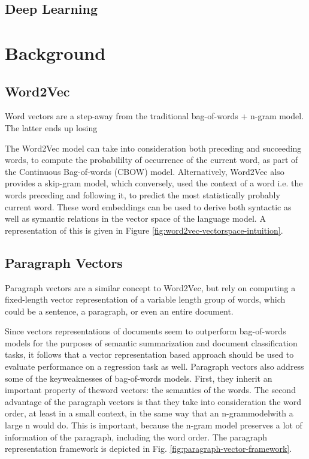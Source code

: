 \documentclass[conference]{IEEEtran}
\begin{document}
\subsection{Deep Learning}


\section{Background}

\subsection{Word2Vec} \label{Word2Vec}
Word vectors are a step-away from the traditional bag-of-words + n-gram model. The latter ends up losing

The Word2Vec model\cite{mikolov2013efficient} can take into consideration both preceding and succeeding words, to compute the probabililty of occurrence of the current word, as part of the Continuous Bag-of-words (CBOW) model. Alternatively, Word2Vec also provides a skip-gram model\cite{mikolov2013distributed}, which conversely, used the context of a word i.e. the words preceding and following it, to predict the most statistically probably current word. These word embeddings can be used to derive both syntactic as well as symantic relations in the vector space of the language model. A representation of this is given in Figure \ref{fig:word2vec-vectorspace-intuition}.

\subsection{Paragraph Vectors}
Paragraph vectors are a similar concept to Word2Vec, but rely on computing a fixed-length vector representation of a variable length group of words, which could be a sentence, a paragraph, or even an entire document.

Since vectors representations of documents seem to outperform bag-of-words models for the purposes of semantic summarization and document classification tasks, it follows that a vector representation based approach should be used to evaluate performance on a regression task as well. Paragraph vectors also address some of the keyweaknesses of bag-of-words models. First, they inherit an important property of theword vectors: the semantics of the words. The second advantage of the paragraph vectors is that they take into consideration the word order, at least in a small context, in the same way that an n-grammodelwith a large n would do. This is important, because the n-gram model preserves a lot of information of the paragraph, including the word order\cite{le2014distributed}. The paragraph representation framework is depicted in Fig. \ref{fig:paragraph-vector-framework}.
\end{document}
